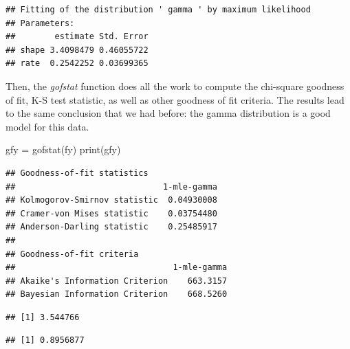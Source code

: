\documentclass[
]{book}
\newenvironment{Shaded}{\begin{snugshade}}{\end{snugshade}}
\newcommand{\CommentTok}[1]{\textcolor[rgb]{0.56,0.35,0.01}{\textit{#1}}}
\newcommand{\FunctionTok}[1]{\textcolor[rgb]{0.00,0.00,0.00}{#1}}
\newcommand{\NormalTok}[1]{#1}
\newcommand{\OtherTok}[1]{\textcolor[rgb]{0.56,0.35,0.01}{#1}}
\newcommand{\SpecialCharTok}[1]{\textcolor[rgb]{0.00,0.00,0.00}{#1}}
\theoremstyle{definition}
\theoremstyle{definition}
\theoremstyle{definition}
\theoremstyle{definition}
\theoremstyle{remark}
\begin{document}
\begin{verbatim}
## Fitting of the distribution ' gamma ' by maximum likelihood 
## Parameters:
##        estimate Std. Error
## shape 3.4098479 0.46055722
## rate  0.2542252 0.03699365
\end{verbatim}

Then, the \emph{gofstat} function does all the work to compute the chi-square goodness
of fit, K-S test statistic, as well as other goodness of fit criteria.
The results lead to the same conclusion that we had before: the gamma
distribution is a good model for this data.

\begin{Shaded}
\begin{Highlighting}[]
\NormalTok{gfy }\OtherTok{=} \FunctionTok{gofstat}\NormalTok{(fy)}
\FunctionTok{print}\NormalTok{(gfy)}
\end{Highlighting}
\end{Shaded}

\begin{verbatim}
## Goodness-of-fit statistics
##                              1-mle-gamma
## Kolmogorov-Smirnov statistic  0.04930008
## Cramer-von Mises statistic    0.03754480
## Anderson-Darling statistic    0.25485917
## 
## Goodness-of-fit criteria
##                                1-mle-gamma
## Akaike's Information Criterion    663.3157
## Bayesian Information Criterion    668.5260
\end{verbatim}

\begin{Shaded}
\end{Shaded}

\begin{verbatim}
## [1] 3.544766
\end{verbatim}

\begin{Shaded}
\end{Shaded}

\begin{verbatim}
## [1] 0.8956877
\end{verbatim}
\end{document}
